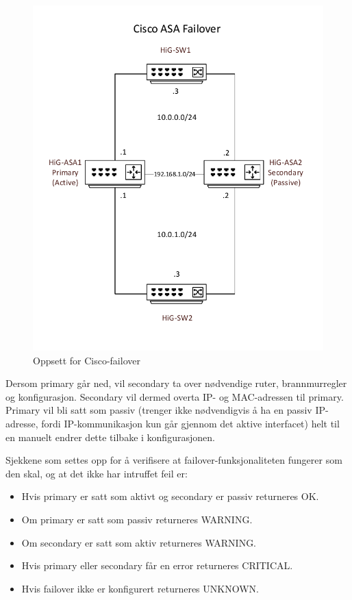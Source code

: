 \begin{figure}[H]
    \centering
    \includegraphics[scale=0.6]{img/asafailover}
    \caption{Oppsett for Cisco-failover}
    \label{ciscoasafailover}
\end{figure}

Dersom primary går ned, vil secondary ta over nødvendige ruter, brannmurregler og konfigurasjon. Secondary vil dermed overta IP- og MAC-adressen til primary. Primary vil bli satt som passiv (trenger ikke nødvendigvis å ha en passiv IP-adresse, fordi IP-kommunikasjon kun går gjennom det aktive interfacet) helt til en manuelt endrer dette tilbake i konfigurasjonen. \cite{ciscofailover} 

Sjekkene som settes opp for å verifisere at failover-funksjonaliteten fungerer som den skal, og at det ikke har intruffet feil er:
\begin{itemize}
\item Hvis primary er satt som aktivt og secondary er passiv returneres OK.
\item Om primary er satt som passiv returneres WARNING. 
\item Om secondary er satt som aktiv returneres WARNING.
\item Hvis primary eller secondary får en error returneres CRITICAL.
\item Hvis failover ikke er konfigurert returneres UNKNOWN. 
\end{itemize}

